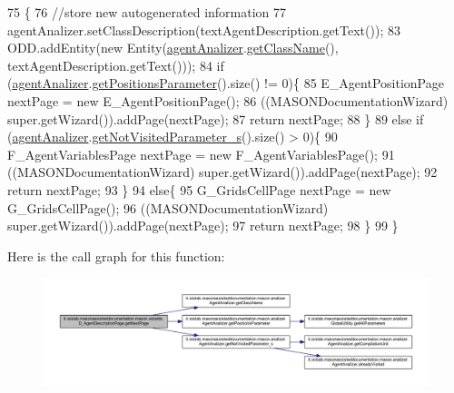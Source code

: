 \begin{DoxyCode}
75                                     \{ 
76         \textcolor{comment}{//store new autogenerated information}
77         agentAnalizer.setClassDescription(textAgentDescription.getText());
83         ODD.addEntity(\textcolor{keyword}{new} Entity(\hyperlink{classit_1_1isislab_1_1masonassisteddocumentation_1_1mason_1_1wizards_1_1_d___agent_description_page_a3551237b74a669c361623caa219af9d7}{agentAnalizer}.\hyperlink{classit_1_1isislab_1_1masonassisteddocumentation_1_1mason_1_1analizer_1_1_agent_analizer_a94492199c5e4873a07a2a46d15617937}{getClassName}(), 
      textAgentDescription.getText()));   
84         \textcolor{keywordflow}{if} (\hyperlink{classit_1_1isislab_1_1masonassisteddocumentation_1_1mason_1_1wizards_1_1_d___agent_description_page_a3551237b74a669c361623caa219af9d7}{agentAnalizer}.\hyperlink{classit_1_1isislab_1_1masonassisteddocumentation_1_1mason_1_1analizer_1_1_agent_analizer_a351c38491d7f706177c4c76478cabd6d}{getPositionsParameter}().size() != 0)\{
85             E\_AgentPositionPage nextPage = \textcolor{keyword}{new} E\_AgentPositionPage();
86             ((MASONDocumentationWizard) super.getWizard()).addPage(nextPage); 
87             \textcolor{keywordflow}{return} nextPage; 
88         \}
89         \textcolor{keywordflow}{else} \textcolor{keywordflow}{if} (\hyperlink{classit_1_1isislab_1_1masonassisteddocumentation_1_1mason_1_1wizards_1_1_d___agent_description_page_a3551237b74a669c361623caa219af9d7}{agentAnalizer}.\hyperlink{classit_1_1isislab_1_1masonassisteddocumentation_1_1mason_1_1analizer_1_1_agent_analizer_ad237f6e49d6d49e0138b1e2ac6a2b0bb}{getNotVisitedParameter\_s}().size() > 0)\{
90             F\_AgentVariablesPage nextPage = \textcolor{keyword}{new} F\_AgentVariablesPage();
91             ((MASONDocumentationWizard) super.getWizard()).addPage(nextPage);
92             \textcolor{keywordflow}{return} nextPage; 
93         \}
94         \textcolor{keywordflow}{else}\{
95             G\_GridsCellPage nextPage = \textcolor{keyword}{new} G\_GridsCellPage();
96             ((MASONDocumentationWizard) super.getWizard()).addPage(nextPage);
97             \textcolor{keywordflow}{return} nextPage; 
98         \}
99     \}
\end{DoxyCode}


Here is the call graph for this function\-:\nopagebreak
\begin{figure}[H]
\begin{center}
\leavevmode
\includegraphics[width=350pt]{classit_1_1isislab_1_1masonassisteddocumentation_1_1mason_1_1wizards_1_1_d___agent_description_page_acd32a9211894d81e238f54607d7b3f73_cgraph}
\end{center}
\end{figure}


